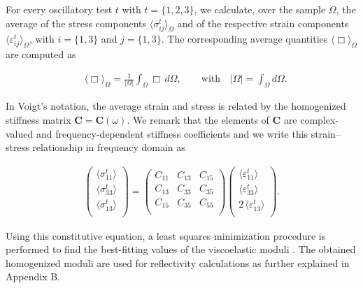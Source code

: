 \documentclass[draft]{agujournal2019}
\begin{document}
For every oscillatory test $t$ with $t = \{1,2,3\}$, we calculate, over the sample $\Omega$, the average  of the stress components $\langle \sigma_{ij}^t \rangle_{\Omega}$ and of the respective strain components $\langle \varepsilon_{ij}^t \rangle_{\Omega}$, with $i=\{1,3\}$ and $j=\{1,3\}$. The corresponding average quantities $\langle \Box \rangle_{\Omega}$ are computed as
\begin{linenomath*}
\begin{equation}\label{Eq.12}
\begin{split}
 &\langle \Box \rangle_{\Omega} = \frac{1}{\vert \Omega \vert} \int_{\Omega} \Box \, d\Omega, \qquad \text{with} \quad  \vert \Omega \vert = \int_{\Omega}  d\Omega.
\end{split}
\end{equation}
\end{linenomath*}

In Voigt's notation, the average strain and stress is related by the homogenized stiffness matrix $\bm{C} = \bm{C} (\omega) $. We remark that the elements of $\bm{C}$  are  complex-valued and frequency-dependent stiffness coefficients and we write this strain--stress relationship in frequency domain as
\begin{linenomath*}
\begin{equation}\label{Eq.13}
 \begin{split}
 \begin{pmatrix}
 \langle \sigma_{11}^t\rangle \\
 \langle \sigma_{33}^t\rangle \\
  \langle\sigma_{13}^t\rangle \\
 \end{pmatrix}
 =
   \begin{pmatrix}
  C_{11} & C_{13} & C_{15} \\
  C_{13} & C_{33} & C_{35} \\
  C_{15} & C_{35} & C_{55}\\
 \end{pmatrix}
  \begin{pmatrix}
 \langle\varepsilon_{11}^t \rangle \\
 \langle \varepsilon_{33}^t \rangle \\
 2\, \langle \varepsilon_{13}^t \rangle \\
 \end{pmatrix}.
 \end{split}
\end{equation}
\end{linenomath*}
Using this constitutive equation, a least squares minimization procedure is performed to find the best-fitting values of the viscoelastic moduli \cite{Rubino2016}. The obtained homogenized moduli are used for reflectivity calculations as further explained in Appendix B.
\end{document}
